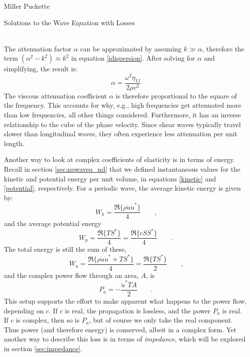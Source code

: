 \documentclass[a4paper,10pt]{report}
\numberwithin{equation}{section}
\begin{document}
\begin{chapter}{Miller Puckette}
\begin{section}{Solutions to the Wave Equation with Losses}
\begin{singlespace}
\begin{align}
 \end{align}
\end{singlespace}
The attenuation factor $\alpha$ can be approximated by assuming $k \gg \alpha$, therefore the term $(\alpha^2 - k^2) \approx k^2$ in equation \eqref{idispersion}. After solving for $\alpha$ and simplifying, the result is\cite[p.~22]{Ballantine1997}:
\begin{equation}\label{alpha}
 \alpha = \frac{\omega^2\eta_{IJ}}{2\rho v^3}
\end{equation}
The viscous attenuation coefficient $\alpha$ is therefore proportional to the square of the frequency. This accounts for why, e.g., high frequencies get attenuated more than low frequencies, all other things considered. Furthermore, it has an inverse relationship to the cube of the phase velocity. Since shear waves typically travel slower than longitudinal waves, they often experience less attenuation per unit length. 

Another way to look at complex coefficients of elasticity is in terms of energy. Recall in section \ref{sec:npwaveq_nd} that we defined instantaneous values for the kinetic and potential energy per unit volume, in equations \eqref{kinetic} and \eqref{potential}, respectively. For a periodic wave, the average kinetic energy is given by\cite[p.~7]{Kino1987}:
\begin{equation}\label{akinetic}
 W_k = \frac{\Re\{\rho \dot{u} \dot{u}^*\}}{4}\qquad \text{,}
\end{equation}
and the average potential energy
\begin{equation}\label{apotential}
W_p = \frac{\Re\{TS^*\}}{4} = \frac{\Re\{cSS^*\}}{4}\qquad \text{.}
\end{equation}
The total energy is still the sum of these, \cite[p.~7]{Kino1987}
\begin{equation}\label{etotal}
 W_a = \frac{\Re\{\rho \dot{u} \dot{u}^* + TS^*\}}{4} = \frac{\Re\{TS^*\}}{2} \qquad \text{,}
\end{equation}
and the complex power flow through an area, $A$, is
\begin{equation}\label{ptotal}
 P_a = -\frac{\dot{u}^*TA}{2} \qquad \text{.}
\end{equation}
This setup supports the effort to make apparent what happens to the power flow, depending on $c$. If $c$ is real, the propagation is lossless, and the power $P_a$ is real. If $c$ is complex, then so is $P_a$, but of course we only take the real component. Thus power (and therefore energy) is conserved, albeit in a complex form.\cite[p.~8]{Kino1987} Yet another way to describe this loss is in terms of \emph{impedance}, which will be explored in section \ref{sec:impedance}. 


\end{section}
\end{chapter}
\end{document}
